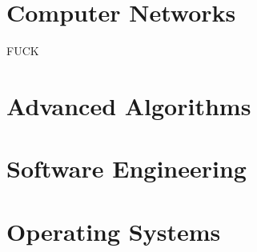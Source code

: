 \part{Computer Networks}
FUCK
\part{Advanced Algorithms}
\part{Software Engineering}
\part{Operating Systems}
